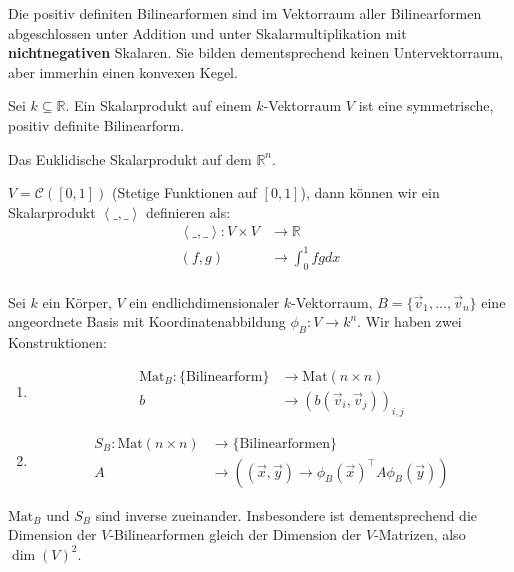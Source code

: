 \documentclass{report}
\newcommand{\tbf}[1]{\textbf{#1}}
\newcommand{\bR}{\mathbb{R}}
\newcommand{\vv}{\vec{v}}
\newcommand{\vx}{\vec{x}}
\newcommand{\vy}{\vec{y}}
\newcommand{\scalar}[2]{\left\langle #1, #2 \right\rangle}
\begin{document}
\begin{beobachtung}
 Die positiv definiten Bilinearformen sind im Vektorraum aller Bilinearformen abgeschlossen unter Addition und unter Skalarmultiplikation mit \tbf{nichtnegativen} Skalaren. Sie bilden dementsprechend keinen Untervektorraum, aber immerhin einen konvexen Kegel.
\end{beobachtung}
\begin{definition}
 Sei $k \subseteq \bR$. Ein Skalarprodukt auf einem $k$-Vektorraum $V$ ist eine symmetrische, positiv definite Bilinearform.
\end{definition}
\begin{beispiel}
 Das Euklidische Skalarprodukt auf dem $\bR^n$.
\end{beispiel}
\begin{beispiel}
 $V = \mathcal{C}([0,1])$ (Stetige Funktionen auf $[0,1]$), dann können wir ein Skalarprodukt $\scalar{\_}{\_}$ definieren als:
 \begin{align*}
  \scalar{\_}{\_} : V \times V &\to \bR\\
  (f,g) &\to \int_{0}^1 f g dx\\
 \end{align*}
\end{beispiel}
\begin{beobachtung}
 Sei $k$ ein Körper, $V$ ein endlichdimensionaler $k$-Vektorraum, $B = \{\vv_1, \hdots, \vv_n\}$ eine angeordnete Basis mit Koordinatenabbildung $\phi_B : V \to k^n$. Wir haben zwei Konstruktionen:
 \begin{enumerate}
  \item \begin{align*}
         \text{Mat}_B: \{\text{Bilinearform}\} &\to \text{Mat}(n \times n)\\
         b &\to (b(\vv_i, \vv_j))_{i,j}
        \end{align*}
  \item \begin{align*}
         S_B : \text{Mat}(n \times n) &\to \{\text{Bilinearformen}\}\\
         A &\to ((\vx,\vy) \to \phi_B(\vx)^\top A \phi_B(\vy))
        \end{align*}
 \end{enumerate}
\end{beobachtung}
\begin{proposition}
 $\text{Mat}_B$ und $S_B$ sind inverse zueinander. Insbesondere ist dementsprechend die Dimension der $V$-Bilinearformen gleich der Dimension der $V$-Matrizen, also $\dim(V)^2$. 
\end{proposition}
\end{document}

